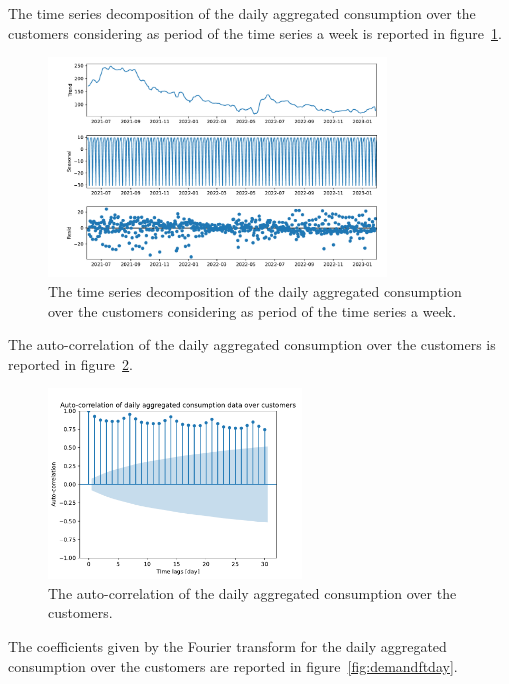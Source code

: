 The time series decomposition of the daily aggregated consumption over the customers considering as period of the time series a week is reported in figure~\ref{fig:demanddecompositionday}. %

\begin{figure}[H]
\centering
\includegraphics[width=0.8\textwidth]{images/demand/daily_aggregated_decomposition}
\caption{The time series decomposition of the daily aggregated consumption over the customers considering as period of the time series a week.}
\label{fig:demanddecompositionday}
\end{figure}

The auto-correlation of the daily aggregated consumption over the customers is reported in figure~\ref{fig:demandcorrelationday}. %

\begin{figure}[H]
\centering
\includegraphics[width=0.6\textwidth]{images/demand/daily_aggregated_correlation}
\caption{The auto-correlation of the daily aggregated consumption over the customers.}
\label{fig:demandcorrelationday}
\end{figure}

The coefficients given by the Fourier transform for the daily aggregated consumption over the customers are reported in figure~\ref{fig:demandftday}. %

